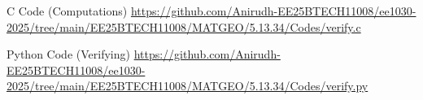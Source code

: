 \documentclass{beamer}
\begin{document}
\begin{frame}[fragile]{C Code (Computations)}
\url{https://github.com/Anirudh-EE25BTECH11008/ee1030-2025/tree/main/EE25BTECH11008/MATGEO/5.13.34/Codes/verify.c}
\end{frame}

\begin{frame}[fragile]{Python Code (Verifying)}
\url{https://github.com/Anirudh-EE25BTECH11008/ee1030-2025/tree/main/EE25BTECH11008/MATGEO/5.13.34/Codes/verify.py}
\end{frame}
\end{document}
